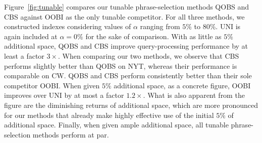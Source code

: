 Figure~\ref{fig:tunable} compares our tunable phrase-selection methods
QOBS and CBS against OOBI as the only tunable competitor. For all
three methods, we constructed indexes considering values of $\alpha$
ranging from $5\%$ to $80\%$. UNI is again included at $\alpha=0\%$
for the sake of comparison. With as little as $5\%$ additional space,
QOBS and CBS improve query-processing performance by at least a factor
$3\times$. When comparing our two methods, we observe that CBS
performs slightly better than QOBS on NYT, whereas their performance
is comparable on CW. QOBS and CBS perform consistently better than
their sole competitor OOBI. When given $5\%$ additional space, as a
concrete figure, OOBI improves over UNI by at most a factor
$1.2\times$. What is also apparent from the figure are the diminishing
returns of additional space, which are more pronounced for our methods
that already make highly effective use of the initial $5\%$ of
additional space. Finally, when given ample additional space, all
tunable phrase-selection methods perform at par.



